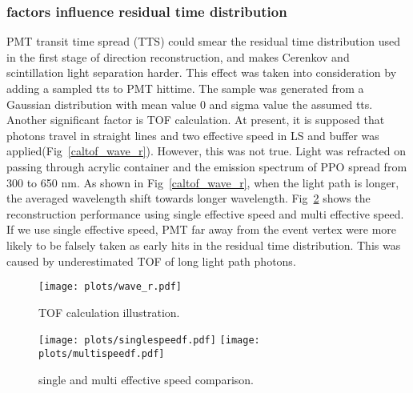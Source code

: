 \documentclass[a4paper,10pt]{cpc-hepnp}
\begin{document}
\subsubsection{factors influence residual time distribution}
PMT transit time spread (TTS) could smear the residual time distribution used
in the first stage of direction reconstruction, and makes Cerenkov and
scintillation light separation harder. This effect was taken into
consideration by adding a sampled tts to PMT hittime. The sample was generated
from a Gaussian distribution with mean value 0 and sigma value the assumed
tts. Another significant factor is TOF calculation. At present, it is supposed
that photons travel in straight lines and two effective speed in LS and buffer
was applied(Fig~\ref{caltof_wave_r}). However, this was not true. Light was
refracted on passing through acrylic container and the emission spectrum of PPO
spread from 300 to 650 nm. As shown in Fig~\ref{caltof_wave_r}, when the light path is
longer, the averaged wavelength shift towards longer wavelength.
Fig~\ref{tof_cor} shows the reconstruction performance using single effective
speed and multi effective speed. If we use single effective speed, PMT far
away from the event vertex were more likely to be falsely taken as early hits
in the residual time distribution. This was caused by underestimated TOF of
long light path photons.
\begin{figure}[htbp]
\centering %
\texttt{[image: plots/wave\_r.pdf]}
\caption{\label{xzcomp} TOF calculation illustration.}
\end{figure}

\begin{figure}[htbp]
\centering %
\texttt{[image: plots/singlespeedf.pdf]}
\hfill
\texttt{[image: plots/multispeedf.pdf]}
\caption{\label{tof_cor} single and multi effective speed comparison.}
\end{figure}
\section{}
\end{document}
